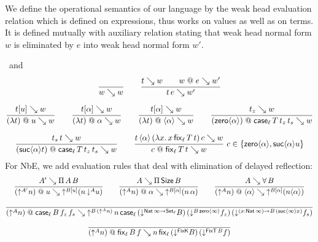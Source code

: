 \documentclass[acmsmall%
]{acmart}\settopmatter{printfolios=true}
\begin{document}
We define the operational semantics of our language by the weak head
evaluation relation  which is defined on
expressions, thus works on values as well as on terms.  It is defined mutually
with auxiliary relation  stating that weak
head normal form $w$ is eliminated by $e$ into weak head normal form $w'$.

\noindent
{}
\ and \
\vspace{-6ex}
\begin{gather*}
  \ru{}{w \evalsto w}
\qquad
  \ru{t \evalsto w \qquad w \at e \evalsto w'}{t\,e \evalsto w'}
\\[1.5ex]
  \ru{t[u] \evalsto w
    }{(\lambda t) \at u \evalsto w}
\qquad
  \ru{t[\alpha] \evalsto w
    }{(\lambda t) \at \alpha \evalsto w}
\qquad
  \ru{t[\alpha] \evalsto w
    }{(\lambda t) \at \ann \alpha \evalsto w}
\qquad
  \ru{t_z \evalsto w
    }{(\zero \alpha) \at \casett \evalsto w}
\\[1.5ex]
  \ru{t_s\, t \evalsto w
    }{(\suc \alpha t) \at \casett \evalsto w}
\qquad
  \rux{t\,\ann \alpha\,(\lambda x.\, x\, \fixtt)\,c \evalsto w
     }{c \at \fixtt \evalsto w
     }{c\in \{ \zero \alpha, \suc \alpha u \}}
\end{gather*}
For NbE, we add evaluation rules that deal with elimination of delayed reflection:
\begin{gather*}
  \ru{A' \evalsto \piT A B
    }{(\up {A'} n) \at u \evalsto \up{B[u]} (n \, \down A u) }
\qquad
  \ru{A \evalsto \piT \Size B
    }{(\up {A} n) \at \alpha \evalsto \up{B[\alpha]} (n \, \alpha)}
\qquad
  \ru{A \evalsto \forallT B
    }{(\up {A} n) \at \ann \alpha \evalsto \up{B[\alpha]} (n \ann \alpha)}
\\[1.2ex]
  \ru{%
    }{(\up {A} n) \at \case[\ell] B {f_z} {f_s} \evalsto
      \up{B\,(\up{A} n)}\,
         n\,\case[\ell]
             {(\down {\Nat \infty \to \Set[\ell]} B)}
             {(\down {B\,{\zero\infty}} f_z)}
             {(\down {\funS x {\Nat \infty} B\,(\suc \infty x)} f_s)}
    }
\\[1ex]
  \ru{%
    }{(\up {A} n) \at \fix[\ell] B f \evalsto
      n\,\fix[\ell] {(\down {\FixK} B)} {(\down {\FixT\, B} f)}
    }
\end{gather*}
\end{document}
